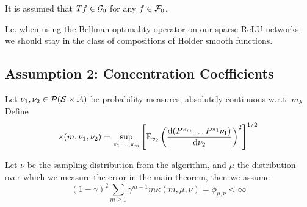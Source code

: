 \begin{asm}\label{asm:A1}
	It is assumed that $T f \in \mathcal{G}_0$ for any $f \in \mathcal{F}_0$.

	I.e. when using the Bellman optimality operator on our sparse ReLU networks,
	we should stay in the class of compositions of Holder smooth functions.
\end{asm}

\subsection{Assumption 2: Concentration Coefficients}

\begin{defn} \label{defn:ccoefs}
	Let $\nu_1, \nu_2 \in \mathcal{P}(\mathcal{S}\times \mathcal{A})$ be probability measures,
	absolutely continuous w.r.t. $m_{\lambda}$
	Define
	\[ \kappa(m, \nu_1, \nu_2) = \sup_{\pi_1, \dots, \pi_m}
		\left[ \mathbb{E}_{v_2} \left( \frac{\mathrm{d} (P^{\pi_m} \dots P^{\pi_1} \nu_1)}
		{\mathrm{d} \nu_2} \right)^2 \right]^{1/2} \]
\end{defn}

\begin{asm}\label{asm:A2}
	Let $\nu$ be the sampling distribution from the algorithm, and $\mu$ the distribution
	over which we measure the error in the main theorem, then we assume
	\[ (1 - \gamma)^2 \sum_{m\geq 1} \gamma^{m-1} m \kappa(m, \mu, \nu)
		= \phi_{\mu, \nu} < \infty \]
\end{asm}



